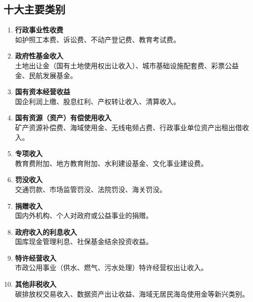 \subsection{十大主要类别}
\begin{enumerate}[leftmargin=*, nosep]
    \item \textbf{行政事业性收费}  \\
    如护照工本费、诉讼费、不动产登记费、教育考试费。
    
    \item \textbf{政府性基金收入}  \\
    土地出让金（国有土地使用权出让收入）、城市基础设施配套费、彩票公益金、民航发展基金。
    
    \item \textbf{国有资本经营收益}  \\
    国企利润上缴、股息红利、产权转让收入、清算收入。
    
    \item \textbf{国有资源（资产）有偿使用收入}  \\
    矿产资源补偿费、海域使用金、无线电频占费、行政事业单位资产出租出借收入。
    
    \item \textbf{专项收入}  \\
    教育费附加、地方教育附加、水利建设基金、文化事业建设费。
    
    \item \textbf{罚没收入}  \\
    交通罚款、市场监管罚没、法院罚没、海关罚没。
    
    \item \textbf{捐赠收入}  \\
    国内外机构、个人对政府或公益事业的捐赠。
    
    \item \textbf{政府收入的利息收入}  \\
    国库现金管理利息、社保基金结余投资收益。
    
    \item \textbf{特许经营收入}  \\
    市政公用事业（供水、燃气、污水处理）特许经营权出让收入。
    
    \item \textbf{其他非税收入}  \\
    碳排放权交易收入、数据资产出让收益、海域无居民海岛使用金等新兴类别。
\end{enumerate}

